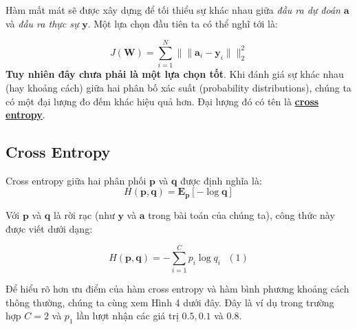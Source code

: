 Hàm mất mát sẽ được xây dựng để tối thiểu sự khác nhau giữa \textit{đầu ra dự đoán} $\mathbf{a}$ và \textit{đầu ra thực sự} $\mathbf{y}$. Một lựa chọn đầu tiên ta có thể nghĩ tới là: 
 
\begin{equation*} 
J(\mathbf{W}) = \sum_{i=1}^N \|\|\mathbf{a}_i - \mathbf{y}_i\|\|_2^2 
\end{equation*} 
\textbf{Tuy nhiên đây chưa phải là một lựa chọn tốt}. Khi đánh giá sự khác nhau (hay khoảng cách) giữa hai phân bố xác suất (probability distributions), chúng ta có một đại lượng đo đếm khác hiệu quả hơn. Đại lượng đó có tên là \href{https://en.wikipedia.org/wiki/Cross_entropy}{\textbf{cross entropy}}. 
 
 
\subsection{Cross Entropy }
Cross entropy giữa hai phân phối $\mathbf{p}$ và $\mathbf{q}$ được định nghĩa là: 
\begin{equation*} 
H(\mathbf{p}, \mathbf{q}) = \mathbf{E_p}[-\log \mathbf{q}] 
\end{equation*} 
 
Với $\mathbf{p}$ và $\mathbf{q}$ là rời rạc (như $\mathbf{y}$ và $\mathbf{a}$ trong bài toán của chúng ta), công thức này được viết dưới dạng:  
 
\begin{equation*} 
H(\mathbf{p}, \mathbf{q}) =-\sum_{i=1}^C p_i \log q_i ~~~ (1) 
\end{equation*} 
 
Để hiểu rõ hơn ưu điểm của hàm cross entropy và hàm bình phương khoảng cách thông thường, chúng ta cùng xem Hình 4 dưới đây. Đây là ví dụ trong trường hợp $C = 2$ và $p_1$ lần lượt nhận các giá trị $0.5, 0.1$ và $0.8$. 
 
 
